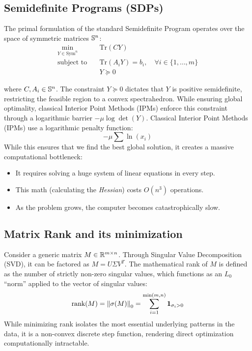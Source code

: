\subsection{Semidefinite Programs (SDPs)}
The primal formulation of the standard Semidefinite Program operates over the space of symmetric matrices $\mathbb{S}^n$:
\begin{align}
\min_{Y \in \text{Sym}^n} \quad & \text{Tr}(CY) \nonumber \\
\text{subject to} \quad & \text{Tr}(A_iY) = b_i, \quad \forall i \in \{1, \dots, m\} \\
& Y \succeq 0 \nonumber
\end{align}

where $C, A_i \in \mathbb{S}^n$. The constraint $Y \succeq 0$ dictates that $Y$ is positive semidefinite, restricting the feasible region to a convex spectrahedron. While ensuring global optimality, classical Interior Point Methods (IPMs) enforce this constraint through a logarithmic barrier $-\mu \log \det(Y)$. Classical Interior Point Methods (IPMs) use a logarithmic penalty function:
\[ -\mu \sum \ln(x_i) \]
While this ensures that we find the best global solution, it creates a massive computational bottleneck:
\begin{itemize}
    \item It requires solving a huge system of linear equations in every step.
    \item This math (calculating the \textit{Hessian}) costs $O(n^3)$ operations.
    \item As the problem grows, the computer becomes catastrophically slow.
\end{itemize}

\subsection{Matrix Rank and its minimization}
Consider a generic matrix $M \in \mathbb{R}^{m \times n}$. Through Singular Value Decomposition (SVD), it can be factored as $M = U \Sigma V^T$. The mathematical rank of $M$ is defined as the number of strictly non-zero singular values, which functions as an $L_0$ ``norm'' applied to the vector of singular values:
\begin{equation}
\text{rank}(M) = \left\lVert\sigma(M)\right\rVert_0 = \sum_{i=1}^{\min(m,n)} \mathbf{1}_{\sigma_i > 0}
\end{equation}
While minimizing rank isolates the most essential underlying patterns in the data, it is a non-convex discrete step function, rendering direct optimization computationally intractable.

